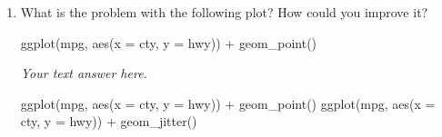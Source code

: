 \documentclass[
  letterpaper,
  DIV=11,
  numbers=noendperiod]{scrreprt}
\newenvironment{Shaded}{\begin{snugshade}}{\end{snugshade}}
\newcommand{\AttributeTok}[1]{\textcolor[rgb]{0.40,0.45,0.13}{#1}}
\newcommand{\FunctionTok}[1]{\textcolor[rgb]{0.28,0.35,0.67}{#1}}
\newcommand{\NormalTok}[1]{\textcolor[rgb]{0.00,0.23,0.31}{#1}}
\newcommand{\SpecialCharTok}[1]{\textcolor[rgb]{0.37,0.37,0.37}{#1}}
\begin{document}
\begin{enumerate}
\begin{figure}
\begin{minipage}[t]{0.50\linewidth}
{  }

  \end{minipage}%
  \newline
  \begin{minipage}[t]{0.50\linewidth}

  {\centering 


  }

  \end{minipage}%
  \begin{minipage}[t]{0.50\linewidth}

  {\centering 


  }

  \end{minipage}%

  \end{figure}
\item
  What is the problem with the following plot? How could you improve it?

\begin{Shaded}
\begin{Highlighting}[]
\FunctionTok{ggplot}\NormalTok{(mpg, }\FunctionTok{aes}\NormalTok{(}\AttributeTok{x =}\NormalTok{ cty, }\AttributeTok{y =}\NormalTok{ hwy)) }\SpecialCharTok{+} 
  \FunctionTok{geom\_point}\NormalTok{()}
\end{Highlighting}
\end{Shaded}

  \begin{tcolorbox}[enhanced jigsaw, left=2mm, rightrule=.15mm, bottomtitle=1mm, opacitybacktitle=0.6, leftrule=.75mm, opacityback=0, colframe=quarto-callout-note-color-frame, bottomrule=.15mm, coltitle=black, toptitle=1mm, colback=white, titlerule=0mm, colbacktitle=quarto-callout-note-color!10!white, title={Answer}, toprule=.15mm, breakable, arc=.35mm]

  \emph{Your text answer here.}

  \end{tcolorbox}

\begin{Shaded}
\begin{Highlighting}[]
\FunctionTok{ggplot}\NormalTok{(mpg, }\FunctionTok{aes}\NormalTok{(}\AttributeTok{x =}\NormalTok{ cty, }\AttributeTok{y =}\NormalTok{ hwy)) }\SpecialCharTok{+} 
  \FunctionTok{geom\_point}\NormalTok{()}
\FunctionTok{ggplot}\NormalTok{(mpg, }\FunctionTok{aes}\NormalTok{(}\AttributeTok{x =}\NormalTok{ cty, }\AttributeTok{y =}\NormalTok{ hwy)) }\SpecialCharTok{+} 
  \FunctionTok{geom\_jitter}\NormalTok{()}
\end{Highlighting}
\end{Shaded}


\end{enumerate}
\end{document}
